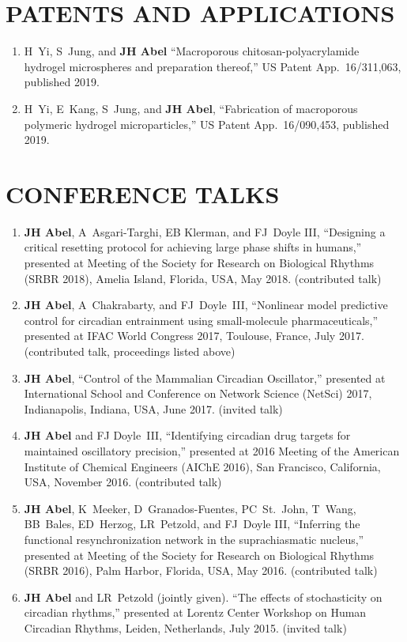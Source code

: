 \documentclass[line,10pt]{res}
\begin{document}
\begin{resume}
\section{\bf PATENTS AND APPLICATIONS}
\vspace{1em}\null
\begin{enumerate}
    \setlength\itemsep{0.8em}
    \item H~Yi, S~Jung, and \textbf{JH Abel} ``Macroporous chitosan-polyacrylamide hydrogel microspheres and preparation thereof,'' US Patent App.\ 16/311,063, published 2019.
    \item H~Yi, E~Kang, S~Jung, and \textbf{JH Abel}, ``Fabrication of macroporous polymeric hydrogel microparticles,'' US Patent App.\ 16/090,453, published 2019.
\end{enumerate}


\section{\bf CONFERENCE TALKS}
\vspace{1em}\null
\begin{enumerate}
    \setlength\itemsep{0.8em}
    \item \textbf{JH Abel}, A~Asgari-Targhi, EB Klerman, and FJ~Doyle III,
``Designing a critical resetting protocol for achieving large phase shifts in humans,''
presented at Meeting of the Society for Research on Biological Rhythms (SRBR 2018), Amelia Island, Florida, USA, May 2018. (contributed talk)
    \item \textbf{JH Abel}, A~Chakrabarty, and FJ~Doyle~III, ``Nonlinear model predictive control for circadian entrainment using small-molecule pharmaceuticals,'' presented at IFAC World Congress 2017, Toulouse, France, July 2017. (contributed talk, proceedings listed above)
    \item \textbf{JH Abel}, ``Control of the Mammalian Circadian Oscillator,'' presented at International School and Conference on Network Science (NetSci) 2017, Indianapolis, Indiana, USA, June 2017. (invited talk)
    \item \textbf{JH Abel} and FJ Doyle~III, ``Identifying circadian drug targets for maintained oscillatory precision,'' presented at 2016 Meeting of the American Institute of Chemical Engineers (AIChE 2016), San Francisco, California, USA, November 2016. (contributed talk)
    \item \textbf{JH Abel}, K~Meeker, D~Granados-Fuentes, PC~St.~John, T~Wang, BB~Bales, ED~Herzog, LR~Petzold, and FJ~Doyle III,
``Inferring the functional resynchronization network in the suprachiasmatic nucleus,''
presented at Meeting of the Society for Research on Biological Rhythms (SRBR 2016), Palm Harbor, Florida, USA, May 2016. (contributed talk)
    \item \textbf{JH Abel} and LR~Petzold (jointly given). ``The effects of stochasticity on circadian rhythms,'' presented at Lorentz Center Workshop on Human Circadian Rhythms, Leiden, Netherlands, July 2015. (invited talk)
\end{enumerate}


\end{resume}
\end{document}
